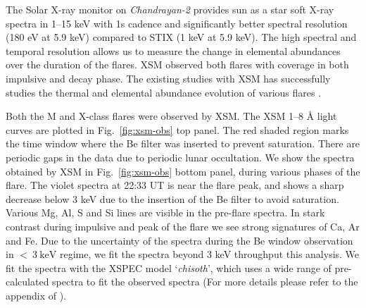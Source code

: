 \documentclass[lineno, pdflatex,sn-mathphys-ay]{sn-jnl}%
\begin{document}

The Solar X-ray monitor on {\it Chandrayan-2}\citep[{\it Chandrayan-2}/XSM,][]{xsm} provides sun as a star soft X-ray spectra in 1{--}15 keV with 1s cadence and significantly better spectral resolution (180 eV at 5.9 keV) compared to STIX (1 keV at 5.9 keV). The high spectral and temporal resolution allows us to measure the change in elemental abundances over the duration of the flares. XSM observed both flares with coverage in both impulsive and decay phase. The existing studies with XSM has successfully studies the thermal and elemental abundance evolution of various flares \citep{mondal21,kkepa23,nama23}.

Both the M and X-class flares were observed by XSM. The XSM 1{--}8 {\AA} light curves are plotted in Fig.~\ref{fig:xsm-obs} top panel. The red shaded region marks the time window where the Be filter was inserted to prevent saturation. There are periodic gaps in the data due to periodic lunar occultation. We show the spectra obtained by XSM in Fig.~\ref{fig:xsm-obs} bottom panel, during various phases of the flare. The violet spectra at 22:33 UT is near the flare peak, and shows a sharp decrease below 3 keV due to the insertion of the Be filter to avoid saturation. Various Mg, Al, S and Si lines are visible in the pre-flare spectra. In stark contrast during impulsive and peak of the flare we see strong signatures of Ca, Ar and Fe. Due to the uncertainty of the spectra during the Be window observation in $<~3~\mathrm{keV}$ regime, we fit the spectra beyond 3 keV throughput this analysis. We fit the spectra with the XSPEC model `{\it chisoth}', which uses a wide range of pre-calculated spectra to fit the observed spectra (For more details please refer to the appendix of \cite{mondal21}).
\end{document}
